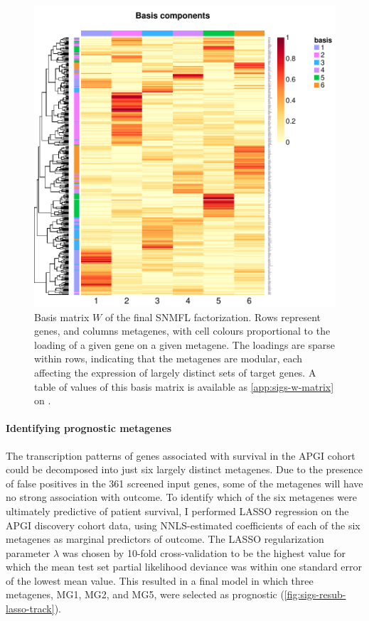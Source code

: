 \documentclass[dissertation.tex]{subfiles}
\begin{document}
\begin{figure}
\centering
\includegraphics[width=.7\linewidth]{analysis/biosurv/reports/18_SIS_diag_dsd_final/figure/nmf-plots-2}
\caption{Basis matrix $W$ of the final \acrshort{SNMFL} factorization.  Rows represent genes, and columns metagenes, with cell colours proportional to the loading of a given gene on a given metagene.  The loadings are sparse within rows, indicating that the metagenes are modular, each affecting the expression of largely distinct sets of target genes.  A table of values of this basis matrix is available as \cref{app:sigs-w-matrix} on .\label{fig:sigs-nmf-basis}}
\end{figure}

\paragraph{Identifying prognostic metagenes}
The transcription patterns of genes associated with survival in the \gls{APGI} cohort could be decomposed into just six largely distinct metagenes.  Due to the presence of false positives in the 361 screened input genes, some of the metagenes will have no strong association with outcome.  To identify which of the six metagenes were ultimately predictive of patient survival, I performed \gls{LASSO} regression on the \gls{APGI} discovery cohort data, using \gls{NNLS}-estimated coefficients of each of the six metagenes as marginal predictors of outcome.  The \gls{LASSO} regularization parameter $\lambda$ was chosen by 10-fold cross-validation to be the highest value for which the mean test set partial likelihood deviance was within one standard error of the lowest mean value.  This resulted in a final model in which three metagenes, MG1, MG2, and MG5, were selected as prognostic (\cref{fig:sigs-resub-lasso-track}).
\end{document}
